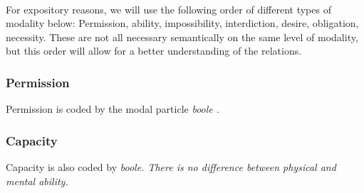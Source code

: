\\


For expository reasons, we will use the following order of different types of modality below: Permission, ability, impossibility, interdiction, desire, obligation, necessity. These are not all necessary semantically on the same level of modality, but this order will allow for a better understanding of the relations.

\subsubsection{Permission}\label{sec:func:Permission}
Permission is coded by the modal particle \em boole \em {}.





\subsubsection{Capacity}\label{sec:func:Capacity}
Capacity is also coded by \em boole\em. There is no difference between physical   and mental ability.




